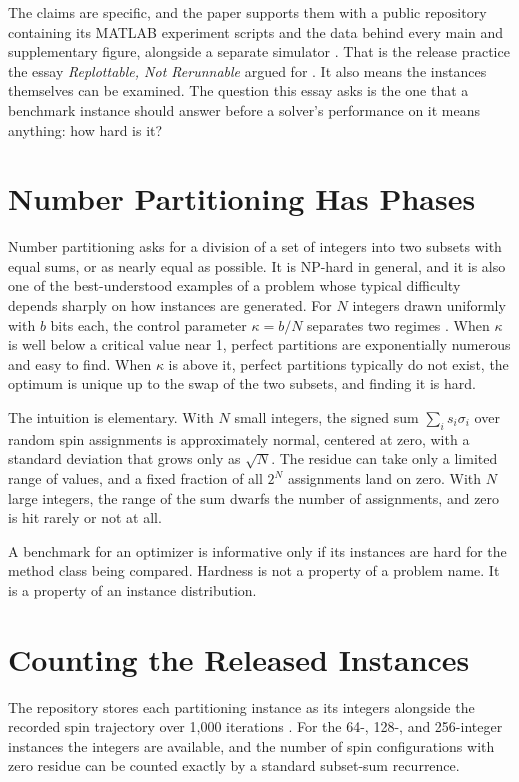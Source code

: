 \documentclass[11pt]{article}
\theoremstyle{definition}
\theoremstyle{remark}
\begin{document}
The claims are specific, and the paper supports them with a public repository containing its MATLAB experiment scripts and the data behind every main and supplementary figure, alongside a separate simulator \cite{cmimrepo}. That is the release practice the essay \emph{Replottable, Not Rerunnable} argued for \cite{flyxion-replot}. It also means the instances themselves can be examined. The question this essay asks is the one that a benchmark instance should answer before a solver's performance on it means anything: how hard is it?

\section{Number Partitioning Has Phases}

Number partitioning asks for a division of a set of integers into two subsets with equal sums, or as nearly equal as possible. It is NP-hard in general, and it is also one of the best-understood examples of a problem whose typical difficulty depends sharply on how instances are generated. For $N$ integers drawn uniformly with $b$ bits each, the control parameter $\kappa = b/N$ separates two regimes \cite{mertens1998,borgs2001}. When $\kappa$ is well below a critical value near 1, perfect partitions are exponentially numerous and easy to find. When $\kappa$ is above it, perfect partitions typically do not exist, the optimum is unique up to the swap of the two subsets, and finding it is hard.

The intuition is elementary. With $N$ small integers, the signed sum $\sum_i s_i \sigma_i$ over random spin assignments is approximately normal, centered at zero, with a standard deviation that grows only as $\sqrt{N}$. The residue can take only a limited range of values, and a fixed fraction of all $2^N$ assignments land on zero. With $N$ large integers, the range of the sum dwarfs the number of assignments, and zero is hit rarely or not at all.

A benchmark for an optimizer is informative only if its instances are hard for the method class being compared. Hardness is not a property of a problem name. It is a property of an instance distribution.

\section{Counting the Released Instances}

The repository stores each partitioning instance as its integers alongside the recorded spin trajectory over 1,000 iterations \cite{cmimrepo}. For the 64-, 128-, and 256-integer instances the integers are available, and the number of spin configurations with zero residue can be counted exactly by a standard subset-sum recurrence.
\end{document}
